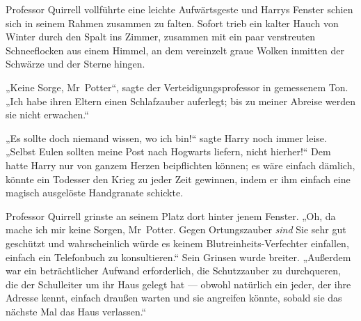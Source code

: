 Professor Quirrell vollführte eine leichte Aufwärtsgeste und Harrys Fenster schien sich in seinem Rahmen zusammen zu falten. Sofort trieb ein kalter Hauch von Winter durch den Spalt ins Zimmer, zusammen mit ein paar verstreuten Schneeflocken aus einem Himmel, an dem vereinzelt graue Wolken inmitten der Schwärze und der Sterne hingen.

„Keine Sorge, Mr~Potter“, sagte der Verteidigungsprofessor in gemessenem Ton.
„Ich habe ihren Eltern einen Schlafzauber auferlegt; bis zu meiner Abreise werden sie nicht erwachen.“

„Es sollte doch niemand wissen, wo ich bin!“ sagte Harry noch immer leise.
„Selbst Eulen sollten meine Post nach Hogwarts liefern, nicht hierher!“ Dem hatte Harry nur von ganzem Herzen beipflichten können; es wäre einfach dämlich, könnte ein Todesser den Krieg zu jeder Zeit gewinnen, indem er ihm einfach eine magisch ausgelöste Handgranate schickte.

Professor Quirrell grinste an seinem Platz dort hinter jenem Fenster.
„Oh, da mache ich mir keine Sorgen, Mr~Potter. Gegen Ortungszauber \emph{sind} Sie sehr gut geschützt und wahrscheinlich würde es keinem Blutreinheits-Verfechter einfallen, einfach ein Telefonbuch zu konsultieren.“ Sein Grinsen wurde breiter.
„Außerdem war ein beträchtlicher Aufwand erforderlich, die Schutzzauber zu durchqueren, die der Schulleiter um ihr Haus gelegt hat — obwohl natürlich ein jeder, der ihre Adresse kennt, einfach draußen warten und sie angreifen könnte, sobald sie das nächste Mal das Haus verlassen.“

